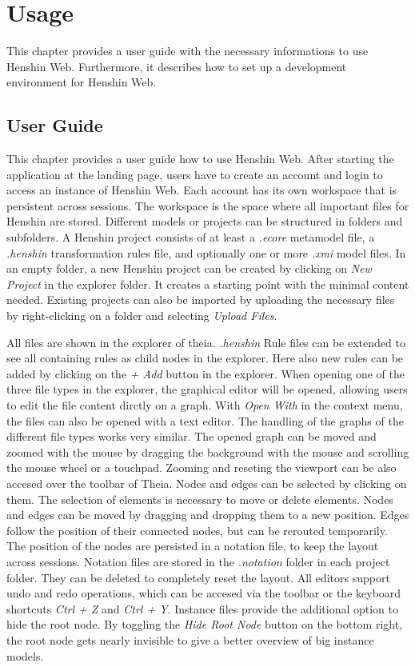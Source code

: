 \chapter{Usage}
\label{chap:usage}

This chapter provides a user guide with the necessary informations to use Henshin Web. Furthermore, it describes how to set up a development environment for Henshin Web.

\section{User Guide}
\label{sec:user_guide}

This chapter provides a user guide how to use Henshin Web. After starting the application at the landing page, users have to create an account and login to access an instance of Henshin Web. Each account has its own workspace that is persistent across sessions. The workspace is the space where all important files for Henshin are stored. Different models or projects can be structured in folders and subfolders. A Henshin project consists of at least a \textit{.ecore} metamodel file, a \textit{.henshin} transformation rules file, and optionally one or more \textit{.xmi} model files. In an empty folder, a new Henshin project can be created by clicking on \textit{New Project} in the explorer folder. It creates a starting point with the minimal content needed. Existing projects can also be imported by uploading the necessary files by right-clicking on a folder and selecting \textit{Upload Files}. 

All files are shown in the explorer of theia. \textit{.henshin} Rule files can be extended to see all containing rules as child nodes in the explorer. Here also new rules can be added by clicking on the \textit{+ Add} button in the explorer. When opening one of the three file types in the explorer, the graphical editor will be opened, allowing users to edit the file content dirctly on a graph. With \textit{Open With} in the context menu, the files can also be opened with a text editor. The handling of the graphs of the different file types works very similar. The opened graph can be moved and zoomed with the mouse by dragging the background with the mouse and scrolling the mouse wheel or a touchpad. Zooming and reseting the viewport can be also accesed over the toolbar of Theia. Nodes and edges can be selected by clicking on them. The selection of elements is necessary to move or delete elements. Nodes and edges can be moved by dragging and dropping them to a new position. Edges follow the position of their connected nodes, but can be rerouted temporarily. The position of the nodes are persisted in a notation file, to keep the layout across sessions. Notation files are stored in the \textit{.notation} folder in each project folder. They can be deleted to completely reset the layout. All editors support undo and redo operations, which can be accesed via the toolbar or the keyboard shortcuts \textit{Ctrl + Z} and \textit{Ctrl + Y}. Instance files provide the additional option to hide the root node. By toggling the \textit{Hide Root Node} button on the bottom right, the root node gets nearly invisible to give a better overview of big instance models.

